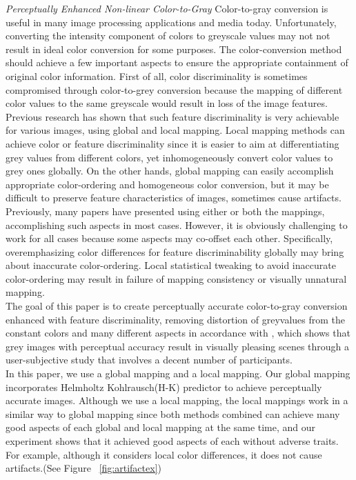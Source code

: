 \documentclass{article}
\begin{document}
{\it Perceptually Enhanced Non-linear Color-to-Gray}
Color-to-gray conversion is useful in many image processing applications and media today. Unfortunately, converting the intensity component of colors to greyscale values may not not result in ideal color conversion for some purposes. The color-conversion method should achieve a few important aspects to ensure the appropriate containment of original color information. First of all, color discriminality is sometimes compromised through color-to-grey conversion because the mapping of different color values to the same greyscale would result in loss of the image features. Previous research has shown that such feature discriminality is very achievable for various images, using global and local mapping. Local mapping methods can achieve color or feature discriminality since it is easier to aim at differentiating grey values from different colors, yet inhomogeneously convert color values to grey ones globally. On the other hands, global mapping can easily accomplish appropriate color-ordering and homogeneous color conversion, but it may be difficult to preserve feature characteristics of images, sometimes cause artifacts. Previously, many papers have presented using either or both the mappings, accomplishing such aspects in most cases. However, it is obviously challenging to work for all cases because some aspects may co-offset each other. Specifically, overemphasizing color differences for feature discriminability globally may bring about inaccurate color-ordering. Local statistical tweaking to avoid inaccurate color-ordering may result in failure of mapping consistency or visually unnatural mapping. \\
 The goal of this paper is to create perceptually accurate color-to-gray conversion enhanced with feature discriminality, removing distortion of greyvalues from the constant colors and many different aspects in accordance with \cite{cadik08perceptual}, which shows that grey images with perceptual accuracy result in visually pleasing scenes through a user-subjective study that involves a decent number of participants. \\
 In this paper, we use a global mapping and a local mapping. Our global mapping incorporates Helmholtz Kohlrausch(H-K) predictor to achieve perceptually accurate images. \cite{Nayatani97}  Although we use a local mapping, the local mappings work in a similar way to global mapping since both methods combined can achieve many good aspects of each global and local mapping at the same time, and our experiment shows that it achieved good aspects of each without adverse traits. For example, although it considers local color differences, it does not cause artifacts.(See Figure ~\ref{fig:artifactex}) \\
\end{document}
